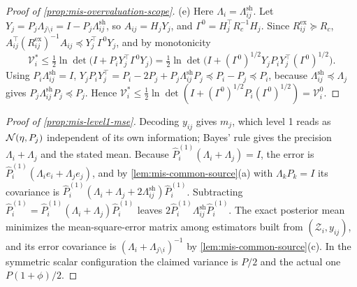 \begin{proof}[Proof of \cref{prop:mis-overvaluation-scope}]
(e) Here $\Lambda_i=\Lambda^{\mathrm{sh}}_{ij}$. Let $Y_j=P_j\Lambda_{j\setminus i}=I-P_j\Lambda^{\mathrm{sh}}_{ij}$, so $A_{ij}=H_jY_j$, and $\Gamma^0=H_j^\top R_c^{-1}H_j$. Since $R^{\mathrm{ex}}_{ij}\succeq R_c$, $A_{ij}^\top(R^{\mathrm{ex}}_{ij})^{-1}A_{ij}\preceq Y_j^\top\Gamma^0Y_j$, and by monotonicity
\begin{equation*}
\mathcal V^\ast_i\le\tfrac12\ln\det\bigl(I+P_iY_j^\top\Gamma^0Y_j\bigr)=\tfrac12\ln\det\bigl(I+(\Gamma^0)^{1/2}Y_jP_iY_j^\top(\Gamma^0)^{1/2}\bigr).
\end{equation*}
Using $P_i\Lambda^{\mathrm{sh}}_{ij}=I$, $Y_jP_iY_j^\top=P_i-2P_j+P_j\Lambda^{\mathrm{sh}}_{ij}P_j\preceq P_i-P_j\preceq P_i$, because $\Lambda^{\mathrm{sh}}_{ij}\preceq\Lambda_j$ gives $P_j\Lambda^{\mathrm{sh}}_{ij}P_j\preceq P_j$. Hence $\mathcal V^\ast_i\le\tfrac12\ln\det(I+(\Gamma^0)^{1/2}P_i(\Gamma^0)^{1/2})=\mathcal V^0_i$.
\end{proof}

\begin{proof}[Proof of \cref{prop:mis-level1-mse}]
Decoding $y_{ij}$ gives $m_j$, which level 1 reads as $\mathcal{N}(\eta,P_j)$ independent of its own information; Bayes' rule gives the precision $\Lambda_i+\Lambda_j$ and the stated mean. Because $\hat P^{(1)}_i(\Lambda_i+\Lambda_j)=I$, the error is $\hat P^{(1)}_i(\Lambda_ie_i+\Lambda_je_j)$, and by \cref{lem:mis-common-source}(a) with $\Lambda_kP_k=I$ its covariance is $\hat P^{(1)}_i(\Lambda_i+\Lambda_j+2\Lambda^{\mathrm{sh}}_{ij})\hat P^{(1)}_i$. Subtracting $\hat P^{(1)}_i=\hat P^{(1)}_i(\Lambda_i+\Lambda_j)\hat P^{(1)}_i$ leaves $2\hat P^{(1)}_i\Lambda^{\mathrm{sh}}_{ij}\hat P^{(1)}_i$. The exact posterior mean minimizes the mean-square-error matrix among estimators built from $(\mathcal Z_i,y_{ij})$, and its error covariance is $(\Lambda_i+\Lambda_{j\setminus i})^{-1}$ by \cref{lem:mis-common-source}(c). In the symmetric scalar configuration the claimed variance is $P/2$ and the actual one $P(1+\phi)/2$.
\end{proof}

